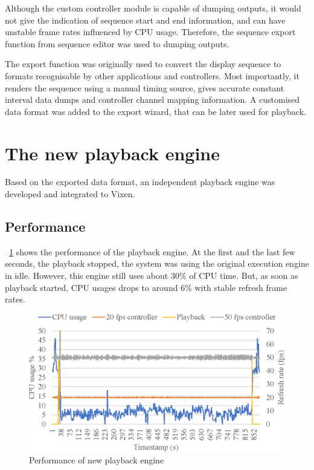 \documentclass[journal]{IEEEtran}
\newcommand{\fref}[1]{\figurename~\ref{#1}}
\begin{document}
Although the custom controller module is capable of dumping outputs, it would not give the indication of sequence start and end information, and can have unstable frame rates influenced by CPU usage. Therefore, the sequence export function from sequence editor was used to dumping outputs.

The export function was originally used to convert the display sequence to formats recognisable by other applications and controllers. Most importantly, it renders the sequence using a manual timing source, gives accurate constant interval data dumps and controller channel mapping information. A customised data format was added to the export wizard, that can be later used for playback.

\section{The new playback engine}

Based on the exported data format, an independent playback engine was developed and integrated to Vixen.

\subsection{Performance}

\fref{fig:playback} shows the performance of the playback engine. At the first and the last few seconds, the playback stopped, the system was using the original execution engine in idle. However, this engine still uses about $30 \%$ of CPU time. But, as soon as playback started, CPU usages drops to around $6 \%$ with stable refresh frame rates.

\begin{figure}[t]
    \centering
    \includegraphics[width=0.8\columnwidth]{playback}
    \caption{Performance of new playback engine}
    \label{fig:playback}
\end{figure}
\end{document}
